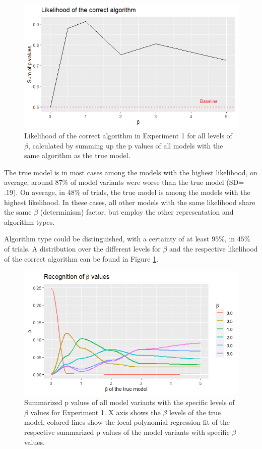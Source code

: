 \begin{figure}
	\centering
	\includegraphics[width=0.95\linewidth]{../../statistics/R_noobst_beta_likelihoodalgo}
	\caption{Likelihood of the correct algorithm in Experiment 1 for all levels of $\beta$, calculated by summing up the p values of all models with the same algorithm as the true model.}
	\label{fig:rnoobstbetalikelihoodalgo}
\end{figure}

The true model is in most cases among the models with the highest likelihood, on average, around 87\% of model variants were worse than the true model (SD= .19).
On average, in 48\% of trials, the true model is among the models with the highest likelihood.
In these cases, all other models with the same likelihood share the same $\beta$ (determinism) factor, but employ the other representation and algorithm types.


Algorithm type could be distinguished, with a certainty of at least $95\%$, in $45\%$ of trials.
A distribution over the different levels for $\beta$ and the respective likelihood of the correct algorithm can be found in Figure \ref{fig:rnoobstbetalikelihoodalgo}.

\begin{figure}
	\centering
	\includegraphics[width=0.95\linewidth]{../../statistics/R_noobst_beta_beta}
	\caption{Summarized p values of all model variants with the specific levels of $\beta$ values for Experiment 1. X axis shows the $\beta$ levels of the true model, colored lines show the local polynomial regression fit of the respective summarized p values of the model variants with specific $\beta$ values.}
	\label{fig:rnoobstbetabeta}
\end{figure}

